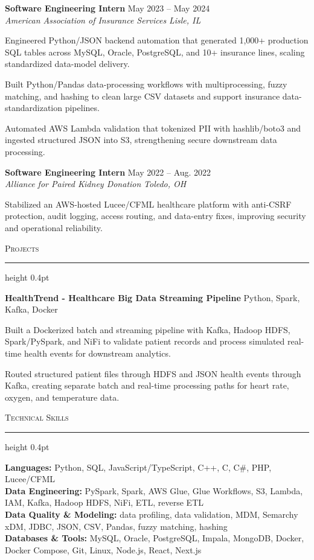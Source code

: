 \documentclass[letterpaper,11pt]{article}
\newcommand{\resumesection}[1]{%
  \par\vspace{2pt}%
  {\large\scshape #1}\par\vspace{2pt}%
  \hrule height 0.4pt\vspace{2pt}%
}
\newcommand{\resumeSubheading}[4]{
  \textbf{#1} \hfill #2\\
  \textit{#3} \hfill \textit{#4}
}
\newcommand{\projectHeading}[2]{
  \textbf{#1} \hfill #2
}
\begin{document}
\resumeSubheading
{Software Engineering Intern}{May 2023 -- May 2024}
{American Association of Insurance Services}{Lisle, IL}
\begin{tightitemize}
  \item Engineered Python/JSON backend automation that generated 1,000+ production SQL tables across MySQL, Oracle, PostgreSQL, and 10+ insurance lines, scaling standardized data-model delivery.
  \item Built Python/Pandas data-processing workflows with multiprocessing, fuzzy matching, and hashing to clean large CSV datasets and support insurance data-standardization pipelines.
  \item Automated AWS Lambda validation that tokenized PII with hashlib/boto3 and ingested structured JSON into S3, strengthening secure downstream data processing.
\end{tightitemize}

\resumeSubheading
{Software Engineering Intern}{May 2022 -- Aug. 2022}
{Alliance for Paired Kidney Donation}{Toledo, OH}
\begin{tightitemize}
  \item Stabilized an AWS-hosted Lucee/CFML healthcare platform with anti-CSRF protection, audit logging, access routing, and data-entry fixes, improving security and operational reliability.
\end{tightitemize}

\resumesection{Projects}
\projectHeading{HealthTrend - Healthcare Big Data Streaming Pipeline}{Python, Spark, Kafka, Docker}
\begin{tightitemize}
  \item Built a Dockerized batch and streaming pipeline with Kafka, Hadoop HDFS, Spark/PySpark, and NiFi to validate patient records and process simulated real-time health events for downstream analytics.
  \item Routed structured patient files through HDFS and JSON health events through Kafka, creating separate batch and real-time processing paths for heart rate, oxygen, and temperature data.
\end{tightitemize}

\resumesection{Technical Skills}
\textbf{Languages:} Python, SQL, JavaScript/TypeScript, C++, C, C\#, PHP, Lucee/CFML\\
\textbf{Data Engineering:} PySpark, Spark, AWS Glue, Glue Workflows, S3, Lambda, IAM, Kafka, Hadoop HDFS, NiFi, ETL, reverse ETL\\
\textbf{Data Quality \& Modeling:} data profiling, data validation, MDM, Semarchy xDM, JDBC, JSON, CSV, Pandas, fuzzy matching, hashing\\
\textbf{Databases \& Tools:} MySQL, Oracle, PostgreSQL, Impala, MongoDB, Docker, Docker Compose, Git, Linux, Node.js, React, Next.js
\end{document}
